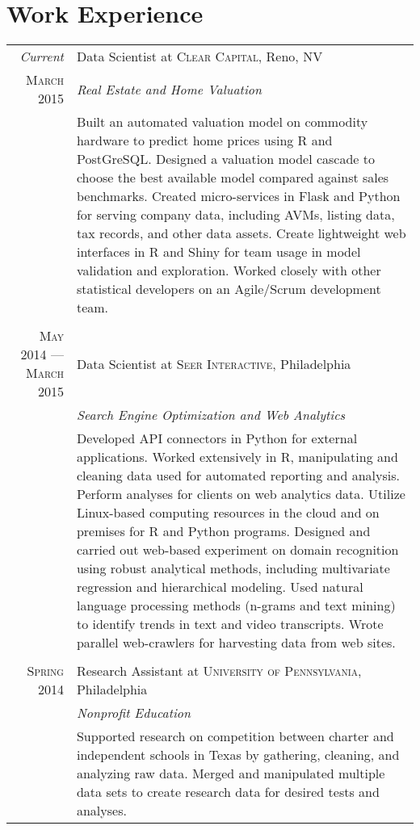 \documentclass[a4paper,10pt]{article}
\begin{document}
\section{Work Experience}
\begin{tabular}{r|p{9.5cm}}
  \emph{Current} & Data Scientist at \textsc{Clear Capital}, Reno, NV \\
  \textsc{March 2015}&\emph{Real Estate and Home Valuation}\\
    &\footnotesize{ 
      Built an automated valuation model on commodity hardware to predict home prices using R and PostGreSQL. Designed a valuation model cascade to choose the best available model compared against sales benchmarks. Created micro-services in Flask and Python for serving company data, including AVMs, listing data, tax records, and other data assets. Create lightweight web interfaces in R and Shiny for team usage in model validation and exploration. Worked closely with other statistical developers on an Agile/Scrum development team.
    }\\
  \multicolumn{2}{c}{} \\
  \textsc{May 2014 --- March 2015} & Data Scientist at \textsc{Seer Interactive}, Philadelphia \\ 
    &\emph{Search Engine Optimization and Web Analytics}\\ 
      &\footnotesize{ 
        Developed API connectors in Python for external applications. Worked extensively in R, manipulating and cleaning data used for automated reporting and analysis. Perform analyses for clients on web analytics data. Utilize Linux-based computing resources in the cloud and on premises for R and Python programs. Designed and carried out web-based experiment on domain recognition using robust analytical methods, including multivariate regression and hierarchical modeling. Used natural language processing methods (n-grams and text mining) to identify trends in text and video transcripts. Wrote parallel web-crawlers for harvesting data from web sites.
    }\\ 
  \multicolumn{2}{c}{} \\ 
  \textsc{Spring 2014} & Research Assistant at \textsc{University of Pennsylvania}, Philadelphia \\
    &\emph{Nonprofit Education}\\ 
    &\footnotesize{ 
      Supported research on competition between charter and independent schools in Texas by gathering, cleaning, and analyzing raw data. Merged and manipulated multiple data sets to create research data for desired tests and analyses.
}
\end{tabular}
\end{document}
